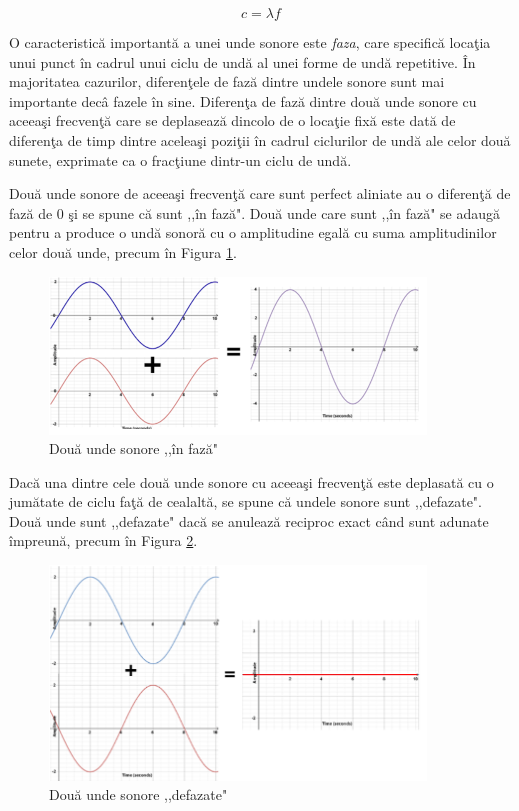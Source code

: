 	\begin{equation}
	c=\lambda f
	\end{equation}	 
	
	O caracteristic\u{a} important\u{a} a unei unde sonore este {\it{faza}}, care specific\u{a} loca\c{t}ia unui punct \^{i}n cadrul unui ciclu de und\u{a} al unei forme de und\u{a} repetitive. \^{I}n majoritatea cazurilor, diferen\c{t}ele de faz\u{a} dintre undele sonore sunt mai importante dec\^{a} fazele \^{i}n sine. Diferen\c{t}a de faz\u{a} dintre dou\u{a} unde sonore cu aceea\c{s}i frecven\c{t}\u{a} care se deplaseaz\u{a} dincolo de o loca\c{t}ie fix\u{a} este dat\u{a} de diferen\c{t}a de timp dintre acelea\c{s}i pozi\c{t}ii \^{i}n cadrul ciclurilor de und\u{a} ale celor dou\u{a} sunete, exprimate ca o frac\c{t}iune dintr-un ciclu de und\u{a}. 	  
	
	Dou\u{a} unde sonore de aceea\c{s}i frecven\c{t}\u{a} care sunt perfect aliniate au o diferen\c{t}\u{a} de faz\u{a} de 0 \c{s}i se spune c\u{a} sunt ,,\^{i}n faz\u{a}". Dou\u{a} unde care sunt ,,\^{i}n faz\u{a}" se adaug\u{a} pentru a produce o und\u{a} sonor\u{a} cu o amplitudine egal\u{a} cu suma amplitudinilor celor dou\u{a} unde, precum în Figura \ref{Fig7}.

	\begin{figure}[!htb]
		\centering
		\includegraphics[width=10cm]{imagini/soundWaveGreaterAmplitude.png}
		\caption{Dou\u{a} unde sonore ,,\^{i}n faz\u{a}"}
		\label{Fig7}
	\end{figure}

	Dac\u{a} una dintre cele dou\u{a} unde sonore cu aceea\c{s}i frecven\c{t}\u{a} este deplasat\u{a} cu o jum\u{a}tate de ciclu fa\c{t}\u{a} de cealalt\u{a}, se spune c\u{a} undele sonore sunt ,,defazate". Dou\u{a} unde sunt ,,defazate" dac\u{a} se anuleaz\u{a} reciproc exact c\^{a}nd sunt adunate \^{i}mpreun\u{a}, precum în Figura \ref{Fig8}.

	\begin{figure}[!htb]
		\centering
		\includegraphics[width=10cm]{imagini/soundWaveCanceledAmplitude.png}
		\caption{Dou\u{a} unde sonore ,,defazate"}
		\label{Fig8}
	\end{figure}

